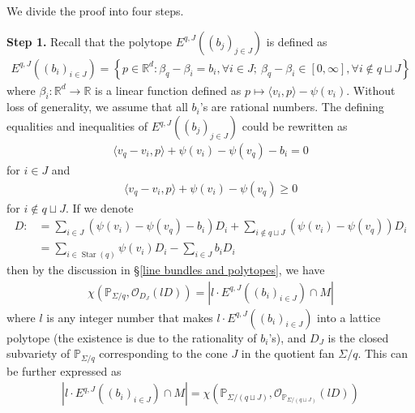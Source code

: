 \documentclass[11pt,reqno]{amsart}
\def\R {{\mathbb R}}
\def\PP {{\mathbb P}}
\theoremstyle{definition}
\numberwithin{equation}{section}
\begin{document}
\smallskip

We divide the proof into four steps. 

\smallskip

{\bf Step 1.}
	Recall that the polytope $E^{q,J}((b_j)_{j\in J})$ is defined as
	\begin{align*}
	E^{q,J}((b_i)_{i\in J})=\left\{p\in\R^d:\beta_q-\beta_i=b_i,\forall i\in J;\ \beta_q-\beta_i\in[0,\infty],\forall i\not\in q\sqcup J\right\}
    \end{align*}
    where $\beta_i:\R^d\rightarrow\R$ is a linear function defined as $p\mapsto \langle v_i, p \rangle-\psi(v_i)$. Without loss of generality, we assume that all $b_i$'s are rational numbers. The defining equalities and inequalities of $E^{q,J}((b_j)_{j\in J})$ could be rewritten as
    \begin{align*}
    	\langle v_q-v_i, p\rangle + \psi(v_i)-\psi(v_q)-b_i = 0
    \end{align*}
    for $i\in J$ and
    \begin{align*}
    	\langle v_q-v_i, p\rangle + \psi(v_i)-\psi(v_q) \geq 0
    \end{align*}
    for $i\not\in q\sqcup J$. If we denote
    \begin{align*}
    	D:&=\sum_{i\in J}(\psi(v_i)-\psi(v_q)-b_i)D_i + \sum_{i\not\in q\sqcup J}(\psi(v_i)-\psi(v_q))D_i \\ 
    	&=\sum_{i\in\operatorname{Star}(q)}\psi(v_i)D_i - \sum_{i\in J}b_i D_i
    \end{align*}
    then by the discussion in \S\ref{line bundles and polytopes}, we have
    \begin{align*}
    	\chi(\PP_{\Sigma/q},\mathcal{O}_{D_J}(lD))=|l\cdot E^{q,J}((b_i)_{i\in J})\cap M|
    \end{align*}
    where $l$ is any integer number that makes $l\cdot E^{q,J}((b_i)_{i\in J})$ into a lattice polytope (the existence is due to the rationality of $b_i$'s), and $D_J$ is the closed subvariety of $\PP_{\Sigma/q}$ corresponding to the cone $J$ in the quotient fan $\Sigma/q$. This can be further expressed as
    \begin{align*}
    	|l\cdot E^{q,J}((b_i)_{i\in J})\cap M|=\chi(\PP_{\Sigma/(q\sqcup J)},\mathcal{O}_{\PP_{\Sigma/(q\sqcup J)}}(lD))
    \end{align*}
    
\medskip
    
\end{document}
